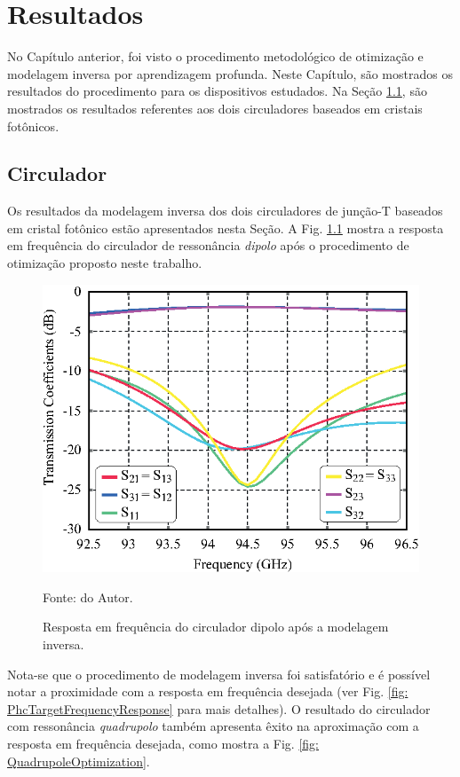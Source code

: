 \chapter{Resultados}      \label{Resultados}

No Capítulo anterior, foi visto o procedimento metodológico de otimização e modelagem inversa por aprendizagem profunda. Neste Capítulo, são mostrados os resultados do procedimento para os dispositivos estudados. Na Seção \ref{Resultado Circulador}, são mostrados os resultados referentes aos dois circuladores baseados em cristais fotônicos.



\section{Circulador}      \label{Resultado Circulador}

Os resultados da modelagem inversa dos dois circuladores de junção-T baseados em cristal fotônico estão apresentados nesta Seção. A Fig. \ref{fig: DipoleOptimization} mostra a resposta em frequência do circulador de ressonância \textit{dipolo} após o procedimento de otimização proposto neste trabalho.

\begin{figure}[H]
	\centering\includegraphics{04-Figuras/DipoleOptimization.eps}
	\caption{Resposta em frequência do circulador dipolo após a modelagem inversa.}
    Fonte: do Autor.
	\label{fig: DipoleOptimization}
\end{figure}

Nota-se que o procedimento de modelagem inversa foi satisfatório e é possível notar a proximidade com a resposta em frequência desejada (ver Fig. \ref{fig: PhcTargetFrequencyResponse} para mais detalhes). O resultado do circulador com ressonância \textit{quadrupolo} também apresenta êxito na aproximação com a resposta em frequência desejada, como mostra a Fig. \ref{fig: QuadrupoleOptimization}.


